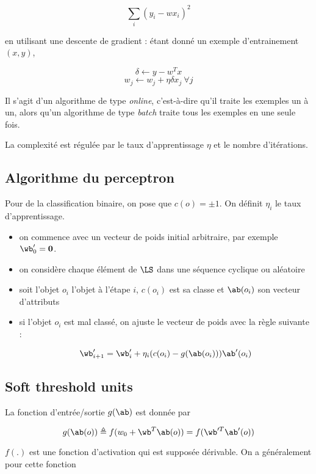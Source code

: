 $$\sum_i (y_i - wx_i)^2$$

en utilisant une descente de gradient : étant donné un exemple d'entrainement $(x, y)$,

$$\delta \leftarrow y - w^Tx$$
$$w_j \leftarrow w_j + \eta \delta x_j \: \forall j$$

Il s'agit d'un algorithme de type \textit{online}, c'est-à-dire qu'il traite les exemples un à un, alors qu'un algorithme de type \textit{batch} traite tous les exemples en une seule fois.

La complexité est régulée par le taux d'apprentissage $\eta$ et le nombre d'itérations.

	\subsection{Algorithme du perceptron}
	
	Pour de la classification binaire, on pose que $c(o) = \pm 1$. On définit $\eta_i$ le taux d'apprentissage.
	
	\begin{itemize}
		\item on commence avec un vecteur de poids initial arbitraire, par exemple $\wb_0' = \textbf{0}$.
		\item on considère chaque élément de $\LS$ dans une séquence cyclique ou aléatoire
		
		\item soit l'objet $o_i$ l'objet à l'étape $i$, $c(o_i)$ est sa classe et $\ab(o_i)$ son vecteur d'attributs
		\item si l'objet $o_i$ est mal classé, on ajuste le vecteur de poids avec la règle suivante :
		
		$$\wb_{i + 1}' = \wb_i' + \eta_i (c(o_i) - g(\ab(o_i))) \ab'(o_i)$$
	\end{itemize}
	
	
	\subsection{Soft threshold units}
	
	La fonction d'entrée/sortie $g(\ab)$ est donnée par
	
	$$g(\ab(o)) \triangleq f(w_0 + \wb^T\ab(o)) = f(\wb'^T \ab'(o))$$
	
	$f(.)$ est une fonction d'activation qui est supposée dérivable. On a généralement pour cette fonction
	
